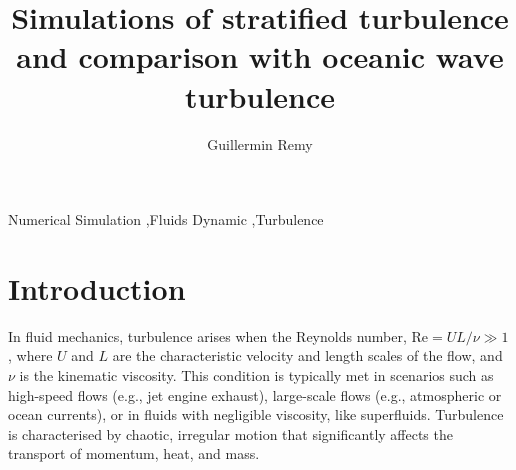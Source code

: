 \documentclass[final,5p,times,twocolumn,authoryear]{elsarticle}
\begin{document}
\begin{frontmatter}


\title{Simulations of stratified turbulence and comparison with oceanic wave turbulence}

\author[first]{Guillermin Remy}

\begin{abstract}

\end{abstract}



\begin{keyword}
Numerical Simulation \sep Fluids Dynamic \sep Turbulence



\end{keyword}


\end{frontmatter}




\section{Introduction}
\label{introduction}

In fluid mechanics, turbulence arises when the Reynolds number, $\mathrm{Re} = UL/\nu \gg 1$, where $U$ and $L$ are the characteristic velocity and length scales of the flow, and $\nu$ is the kinematic viscosity. This condition is typically met in scenarios such as high-speed flows (e.g., jet engine exhaust), large-scale flows (e.g., atmospheric or ocean currents), or in fluids with negligible viscosity, like superfluids. Turbulence is characterised by chaotic, irregular motion that significantly affects the transport of momentum, heat, and mass.
\end{document}
